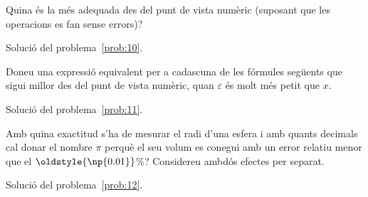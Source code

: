 \documentclass[a4paper,twoside,12pt]{exam}
\newcommand{\osnp}[1]{\oldstyle{\np{#1}}}
\begin{document}
\begin{questions}
Quina és la més adequada des del punt de vista numèric (suposant que
les operacions es fan sense errors)?
\begin{solution}
	Solució del problema~\ref{prob:10}.
\end{solution}

\question\label{prob:11}
Doneu una expressió equivalent per a cadascuna de les fórmules
següents que sigui millor des del punt de vista numèric, quan
$\varepsilon$ és molt més petit que $x$.
\begin{solution}
	Solució del problema~\ref{prob:11}. 
\end{solution}

\question\label{prob:12}
Amb quina exactitud s'ha de mesurar el radi d'una esfera i amb quants 
decimals cal donar el nombre $\pi$ perquè el seu volum es conegui amb 
un error relatiu menor que el $\osnp{0.01}$\%? Considereu ambdós 
efectes per separat.
\begin{solution}
	Solució del problema~\ref{prob:12}.
\end{solution}
\end{questions}
\end{document}

